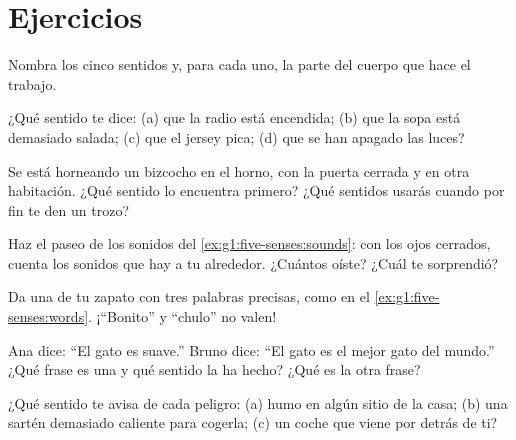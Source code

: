 \section{Ejercicios}

\begin{exercise}[$\star$]\label{exo:g1:five-senses:1}
Nombra los cinco sentidos y, para cada uno, la parte del cuerpo que
hace el trabajo.
\end{exercise}

\begin{exercise}[$\star$]\label{exo:g1:five-senses:2}
¿Qué sentido te dice: (a) que la radio está encendida; (b) que la
sopa está demasiado salada; (c) que el jersey pica; (d) que se han
apagado las luces?
\end{exercise}

\begin{exercise}[$\star$]\label{exo:g1:five-senses:3}
Se está horneando un bizcocho en el horno, con la puerta cerrada y en
otra habitación. ¿Qué sentido lo encuentra primero? ¿Qué sentidos
usarás cuando por fin te den un trozo?
\end{exercise}

\begin{exercise}[$\star$]\label{exo:g1:five-senses:4}
Haz el paseo de los sonidos del \cref{ex:g1:five-senses:sounds}: con
los ojos cerrados, cuenta los sonidos que hay a tu alrededor.
¿Cuántos oíste? ¿Cuál te sorprendió?
\end{exercise}

\begin{exercise}[$\star$]\label{exo:g1:five-senses:5}
Da una  de tu zapato con tres palabras precisas, como en
el \cref{ex:g1:five-senses:words}. ¡``Bonito'' y ``chulo'' no valen!
\end{exercise}

\begin{exercise}[$\star$]\label{exo:g1:five-senses:6}
Ana dice: ``El gato es suave.'' Bruno dice: ``El gato es el mejor
gato del mundo.'' ¿Qué frase es una  y qué sentido la ha
hecho? ¿Qué es la otra frase?
\end{exercise}

\begin{exercise}[$\star$]\label{exo:g1:five-senses:7}
¿Qué sentido te avisa de cada peligro: (a) humo en algún sitio de la
casa; (b) una sartén demasiado caliente para cogerla; (c) un coche
que viene por detrás de ti?
\end{exercise}

